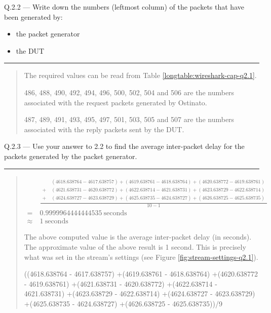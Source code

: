 \documentclass{article}
\newcommand\Que[2]{%
\begin{samepage}
\leavevmode\par
\noindent
Q.#1 --- #2\par\vspace{10pt}\hrule\vspace{10pt}
\end{samepage}}
\newenvironment{ans}
{\fbox{Answer}\begin{quote}\nopagebreak}
{\end{quote}}
\begin{document}
\newpage

\Que{2.2}{Write down the numbers (leftmost column) of the packets that have been generated by:
\begin{itemize}
\item the packet generator
\item the DUT
\end{itemize}
}

\begin{ans}
The required values can be read from Table
\ref{longtable:wireshark-cap-q2.1}.

486, 488, 490, 492, 494, 496, 500, 502, 504 and 506 are the
numbers associated with the request packets generated by
Ostinato.

487, 489, 491, 493, 495, 497, 501, 503, 505 and 507 are the
numbers associated with the reply packets sent by the DUT.
\end{ans}

\Que{2.3}{Use your answer to 2.2 to find the average
inter-packet delay for the packets generated by the packet
generator.}
\begin{ans}

$$
\begin{aligned}
          & \frac{
\begin{aligned}
    & (4618.638764 - 4617.638757)
+(4619.638761 - 4618.638764)
+(4620.638772 - 4619.638761)      \\
+\  & (4621.638731 - 4620.638772)
+(4622.638714 - 4621.638731)
+(4623.638729 - 4622.638714)      \\
+\  & (4624.638727 - 4623.638729)
+(4625.638735 - 4624.638727)
+(4626.638725 - 4625.638735)
\end{aligned}
}{10 - 1}                                      \\
=\        & 0.9999964444444535\ \text{seconds} \\
\approx\  & 1\ \text{seconds}
\end{aligned}
$$

The above computed value is the average inter-packet delay
(in seconds). The approximate value of the above result is 1 second.
This is precisely what was set in the stream's settings (see
Figure \ref{fig:stream-settings-q2.1}).

\begin{gruvboxlisting}[language=Python, caption={Python
expression for calculating the inter-packet delay for
Question 2.3.}]
((4618.638764 - 4617.638757)
+(4619.638761 - 4618.638764)
+(4620.638772 - 4619.638761)
+(4621.638731 - 4620.638772)
+(4622.638714 - 4621.638731)
+(4623.638729 - 4622.638714)
+(4624.638727 - 4623.638729)
+(4625.638735 - 4624.638727)
+(4626.638725 - 4625.638735))/9
\end{gruvboxlisting}

\end{ans}
\end{document}
